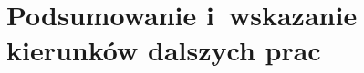 \chapter{Podsumowanie i~wskazanie kierunków dalszych prac}
\label{cha:Podsumowanie i kierunki dalszych prac}





